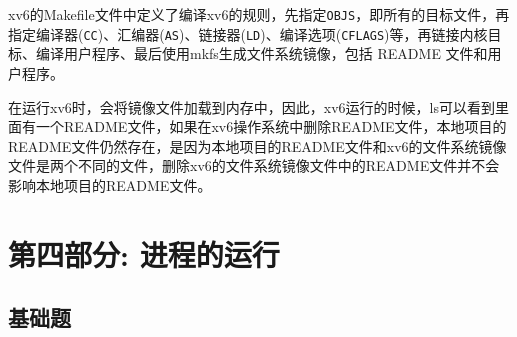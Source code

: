\documentclass[UTF8]{article}
\begin{document}
xv6的Makefile文件中定义了编译xv6的规则，先指定\texttt{OBJS}，即所有的目标文件，再指定编译器(\texttt{CC})、汇编器(\texttt{AS})、链接器(\texttt{LD})、编译选项(\texttt{CFLAGS})等，再链接内核目标、编译用户程序、最后使用mkfs生成文件系统镜像，包括 README 文件和用户程序。

在运行xv6时，会将镜像文件加载到内存中，因此，xv6运行的时候，ls可以看到里面有一个README文件，如果在xv6操作系统中删除README文件，本地项目的README文件仍然存在，是因为本地项目的README文件和xv6的文件系统镜像文件是两个不同的文件，删除xv6的文件系统镜像文件中的README文件并不会影响本地项目的README文件。

\newpage
\section{第四部分: 进程的运行}

\subsection{基础题}
\end{document}
